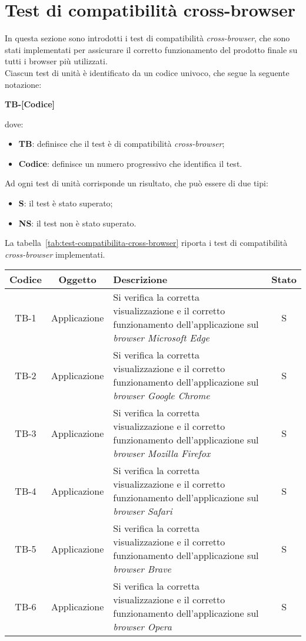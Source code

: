 \section{Test di compatibilità cross-browser}\label{sec:test-compatibilita-cross-browser}
In questa sezione sono introdotti i test di compatibilità \textit{cross-browser}, che sono stati implementati per assicurare il corretto funzionamento del prodotto finale su tutti i browser più utilizzati.\\
Ciascun test di unità è identificato da un codice univoco, che segue la seguente notazione:
\begin{center}
  \textbf{TB-[Codice]}
\end{center}
dove:
\begin{itemize}
  \item \textbf{TB}: definisce che il test è di compatibilità \textit{cross-browser};
  \item \textbf{Codice}: definisce un numero progressivo che identifica il test.
\end{itemize}
Ad ogni test di unità corrisponde un risultato, che può essere di due tipi:
\begin{itemize}
  \item \textbf{S}: il test è stato superato;
  \item \textbf{NS}: il test non è stato superato.
\end{itemize}
La tabella~\ref{tab:test-compatibilita-cross-browser} riporta i test di compatibilità \textit{cross-browser} implementati.

\begin{center}
  \label{tab:test-compatibilita-cross-browser}
  \begin{longtable}{|c|c|p{}|c|}
  \hline
  \textbf{Codice} & \textbf{Oggetto} & \textbf{Descrizione} & \textbf{Stato}\\
  \hline
  TB-1 &Applicazione &Si verifica la corretta visualizzazione e il corretto funzionamento dell'applicazione sul \textit{browser Microsoft Edge} &S \\
  \hline
  TB-2 &Applicazione  &Si verifica la corretta visualizzazione e il corretto funzionamento dell'applicazione  sul \textit{browser Google Chrome} &S \\
  \hline
  TB-3 &Applicazione &Si verifica la corretta visualizzazione e il corretto funzionamento dell'applicazione  sul \textit{browser Mozilla Firefox} &S \\
  \hline
  TB-4 &Applicazione &Si verifica la corretta visualizzazione e il corretto funzionamento dell'applicazione  sul \textit{browser Safari} &S \\
  \hline
  TB-5 &Applicazione &Si verifica la corretta visualizzazione e il corretto funzionamento dell'applicazione  sul \textit{browser Brave} &S \\
  \hline
  TB-6 &Applicazione &Si verifica la corretta visualizzazione e il corretto funzionamento dell'applicazione  sul \textit{browser Opera} &S \\
  \hline
\end{longtable}
\end{center}
